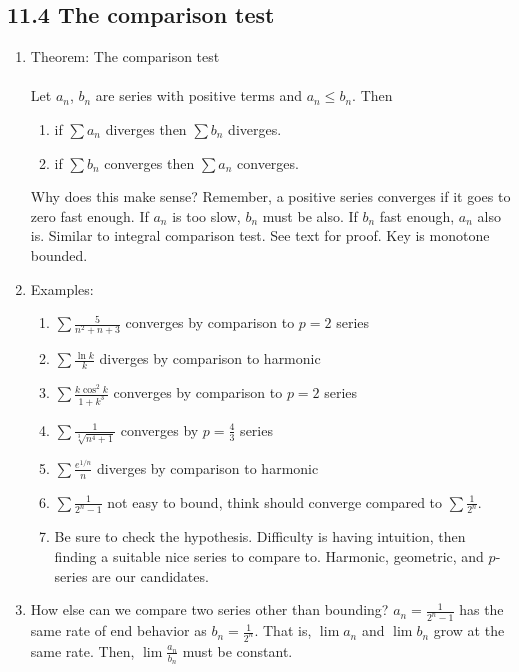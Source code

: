 \documentclass{article}
\newcommand{\ds}{\displaystyle}
\begin{document}
\subsection{11.4 The comparison test}
\begin{enumerate}

\item Theorem: The comparison test \\ \ \\
Let $a_n$, $b_n$ are series with positive terms and $a_n\leq b_n$. Then
\begin{enumerate}
\item if $\sum a_n$ diverges then $\sum b_n$ diverges.
\item if $\sum b_n$ converges then $\sum a_n$ converges.
\end{enumerate}
Why does this make sense? Remember, a positive series converges if it goes to zero fast enough. If $a_n$ is too slow, $b_n$ must be also. If $b_n$ fast enough, $a_n$ also is. Similar to integral comparison test. See text for proof. Key is monotone bounded.

\item Examples:  
\begin{enumerate}
\item $\ds \sum \frac{5}{n^2+n+3}$ converges by comparison to $p=2$ series
\item $\ds \sum \frac{\ln k}{k}$ diverges by comparison to harmonic
\item $\ds \sum \frac{k\cos^2 k}{1+k^3}$ converges by comparison to $p=2$ series
\item $\ds \sum \frac{1}{\sqrt[3]{n^4+1}}$ converges by $p=\frac{4}{3}$ series
\item $\ds \sum \frac{e^{1/n}}{n}$ diverges by comparison to harmonic
\item $\ds \sum \frac{1}{2^n-1}$ not easy to bound, think should converge compared to $\ds \sum \frac{1}{2^n}$.  
\item Be sure to check the hypothesis. Difficulty is having intuition, then finding a suitable nice series to compare to. Harmonic, geometric, and $p$-series are our candidates. 
\end{enumerate}

\item How else can we compare two series other than bounding? $a_n=\frac{1}{2^n-1}$ has the same rate of end behavior as $b_n=\frac{1}{2^n}$. That is, $\lim a_n$ and $\lim b_n$ grow at the same rate. Then,
$\lim \frac{a_n}{b_n}$ must be constant. 


\end{enumerate}
\end{document}
